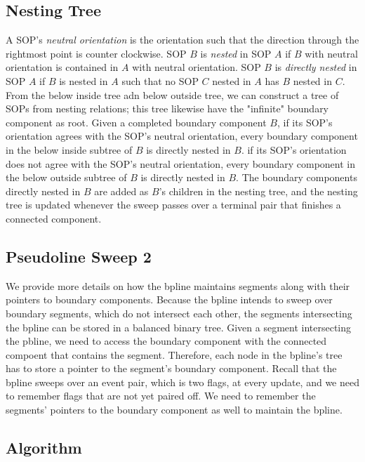 \documentclass[11pt]{article}
\begin{document}
\subsection{Nesting Tree}
A SOP's \textit{neutral orientation} is the orientation such that the direction through the rightmost point is counter clockwise.
SOP $B$ is \textit{nested} in SOP $A$ if $B$ with neutral orientation is contained in $A$ with neutral orientation.
SOP $B$ is \textit{directly nested} in SOP $A$ if $B$ is nested in $A$ such that no SOP $C$ nested in $A$ has $B$ nested in $C$.
From the below inside tree adn below outside tree, we can construct a tree of SOPs from nesting relations; this tree likewise have the "infinite" boundary component as root.
Given a completed boundary component $B$, if its SOP's orientation agrees with the SOP's neutral orientation, every boundary component in the below inside subtree of $B$ is directly nested in $B$.
if its SOP's orientation does not agree with the SOP's neutral orientation, every boundary component in the below outside subtree of $B$ is directly nested in $B$.
The boundary components directly nested in $B$ are added as $B$'s children in the nesting tree, and the nesting tree is updated whenever the sweep passes over a terminal pair that finishes a connected component.

\subsection{Pseudoline Sweep 2}
We provide more details on how the bpline maintains segments along with their pointers to boundary components.
Because the bpline intends to sweep over boundary segments, which do not intersect each other, the segments intersecting the bpline can be stored in a balanced binary tree.
Given a segment intersecting the pbline, we need to access the boundary component with the connected compoent that contains the segment.
Therefore, each node in the bpline's tree has to store a pointer to the segment's boundary component.
Recall that the bpline sweeps over an event pair, which is two flags, at every update, and we need to remember flags that are not yet paired off.
We need to remember the segments' pointers to the boundary component as well to maintain the bpline.

\subsection{Algorithm}
\end{document}
